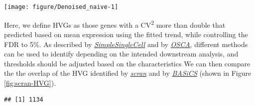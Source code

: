 \documentclass[9pt,a4paper,]{extarticle}
\newenvironment{Shaded}{\begin{snugshade}}{\end{snugshade}}
\newcommand{\DecValTok}[1]{\textcolor[rgb]{0.00,0.00,0.81}{#1}}
\newcommand{\FloatTok}[1]{\textcolor[rgb]{0.00,0.00,0.81}{#1}}
\newcommand{\KeywordTok}[1]{\textcolor[rgb]{0.13,0.29,0.53}{\textbf{#1}}}
\newcommand{\NormalTok}[1]{#1}
\newcommand{\OperatorTok}[1]{\textcolor[rgb]{0.81,0.36,0.00}{\textbf{#1}}}
\newcommand{\StringTok}[1]{\textcolor[rgb]{0.31,0.60,0.02}{#1}}
\begin{document}
\begin{center}\texttt{[image: figure/Denoised\_naive-1]} \end{center}

Here, we define HVGs as those genes with a CV\textsuperscript{2} more than double that
predicted based on mean expression using the fitted trend,
while controlling the FDR to 5\%.
As described by \emph{\href{https://bioconductor.org/packages/3.11/SimpleSingleCell}{SimpleSingleCell}} and by
\href{https://osca.bioconductor.org/}{\emph{OSCA}}, different methods
can be used to identify depending on the intended downstream analysis,
and thresholds should be adjusted based on the characteristics
\citep{Lun2016, Amezquita2019}
We can then compare the the overlap of the HVG identified by
\emph{\href{https://bioconductor.org/packages/3.11/scran}{scran}} and by \emph{\href{https://bioconductor.org/packages/3.11/BASiCS}{BASiCS}} (shown in Figure
\ref{fig:scran-HVG}).

\begin{Shaded}
\end{Shaded}

\begin{verbatim}
## [1] 1134
\end{verbatim}
\end{document}
